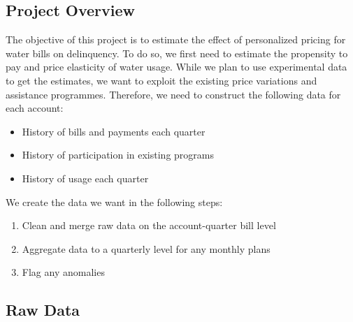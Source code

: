 \documentclass[11pt]{article}
\begin{document}
\subsection*{Project Overview}

The objective of this project is to estimate the effect of personalized pricing for water bills on delinquency. To do so, we first need to estimate the propensity to pay and price elasticity of water usage. While we plan to use experimental data to get the estimates, we want to exploit the existing price variations and assistance programmes. Therefore, we need to construct the following data for each account:
\begin{itemize}
	\item History of bills and payments each quarter
	\item History of participation in existing programs
	\item History of usage each quarter
\end{itemize}
We create the data we want in the following steps:
\begin{enumerate}
	\item Clean and merge raw data on the account-quarter bill level
	\item Aggregate data to a quarterly level for any monthly plans
	\item Flag any anomalies
\end{enumerate}

\subsection*{Raw Data}
\end{document}
